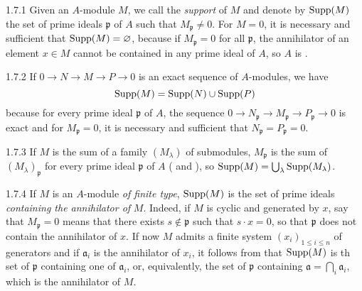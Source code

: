 \documentclass{book}
\begin{document}
\begin{env}{1.7.1}
\label{env-0.1.7.1}
Given an $A$-module $M$, we call the \emph{support} of $M$ and denote by ${\mathop{\mathrm{Supp}}\nolimits}(M)$
the set of prime ideals $\mathfrak{p}$ of $A$ such that $M_\mathfrak{p}\neq 0$. For $M=0$, it
is necessary and sufficient that ${\mathop{\mathrm{Supp}}\nolimits}(M)=\varnothing$, because if $M_\mathfrak{p}=0$ for all
$\mathfrak{p}$, the annihilator of an element $x\in M$ cannot be contained in any prime
ideal of $A$, so $A$ is .
\end{env}

\begin{env}{1.7.2}
\label{env-0.1.7.2}
If $0\to N\to M\to P\to 0$ is an exact sequence of $A$-modules, we have
\[
  {\mathop{\mathrm{Supp}}\nolimits}(M)={\mathop{\mathrm{Supp}}\nolimits}(N)\cup{\mathop{\mathrm{Supp}}\nolimits}(P)
\]
because for every prime ideal $\mathfrak{p}$ of $A$, the sequence
${0\to N_\mathfrak{p}\to M_\mathfrak{p}\to P_\mathfrak{p}\to 0}$ is exact  and for
$M_\mathfrak{p}=0$, it is necessary and sufficient that $N_\mathfrak{p}=P_\mathfrak{p}=0$.
\end{env}

\begin{env}{1.7.3}
\label{env-0.1.7.3}
If $M$ is the sum of a family $(M_\lambda)$ of submodules, $M_\mathfrak{p}$ is the sum
of $(M_\lambda)_\mathfrak{p}$ for every prime ideal $\mathfrak{p}$ of $A$ ( and ),
so ${\mathop{\mathrm{Supp}}\nolimits}(M)=\bigcup_\lambda{\mathop{\mathrm{Supp}}\nolimits}(M_\lambda)$.
\end{env}

\begin{env}{1.7.4}
\label{env-0.1.7.4}
If $M$ is an $A$-module \emph{of finite type}, ${\mathop{\mathrm{Supp}}\nolimits}(M)$ is the set of prime
ideals \emph{containing the annihilator of} $M$. Indeed, if $M$ is cyclic and
generated by $x$, say that $M_\mathfrak{p}=0$ means that there exists $s\not\in\mathfrak{p}$
such that $s\cdot x=0$, so that $\mathfrak{p}$ does not contain the annihilator of $x$.
If now $M$ admits a finite system $(x_i)_{1\leq i\leq n}$ of generators and if
$\mathfrak{a}_i$ is the annihilator of $x_i$, it follows from  that ${\mathop{\mathrm{Supp}}\nolimits}(M)$
is th set of $\mathfrak{p}$ containing one of $\mathfrak{a}_i$, or, equivalently, the
set of $\mathfrak{p}$ containing $\mathfrak{a}=\bigcap_i\mathfrak{a}_i$, which is the annihilator
of $M$.
\end{env}
\end{document}
